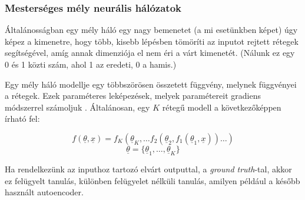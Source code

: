 \subsubsection{Mesterséges mély neurális hálózatok}






Általánosságban egy mély háló egy nagy bemenetet (a mi esetünkben képet) úgy képez
a kimenetre, hogy több, kisebb lépésben tömöríti az inputot rejtett rétegek segítségével,
amíg annak dimenziója el nem éri a várt kimenetét. 
(Nálunk ez egy 0 és 1 közti szám, ahol 1 az eredeti, 0 a hamis.)


Egy mély háló modellje egy többszörösen összetett függvény, melynek függvényei a rétegek. Ezek paraméteres leképezések, melyek paramétereit gradiens módszerrel számoljuk \cite{lecun2015deep, krizhevsky2012imagenet}. Általánosan, egy $ K $ rétegű modell a következőképpen írható fel:

\[ 
f(\underline{\theta},\underline{x})=f_K(\underline{\theta}_K, \dots f_2(\underline{\theta}_2, f_1(\underline{\theta}_1, \underline{x}) ) \dots )
 \]
 \[ \underline{\theta} = \{\underline{\theta}_1, \dots, \underline{\theta}_K\} \]




Ha rendelkezünk az inputhoz tartozó elvárt outputtal, a \textit{ground truth}-tal, akkor ez felügyelt tanulás, különben felügyelet nélküli tanulás, amilyen például a később használt autoencoder.


